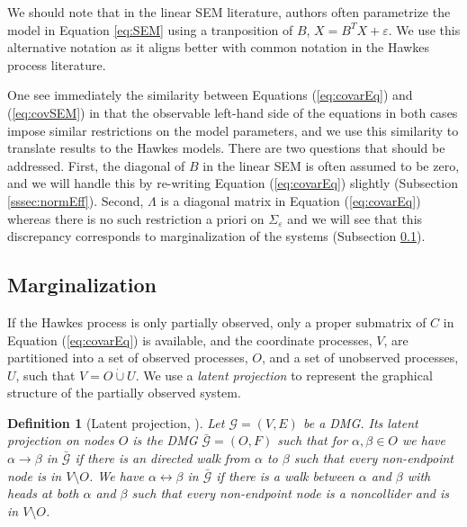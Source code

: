 \documentclass[accepted]{uai2021} %
\newtheorem{defn}[thm]{Definition}
\newcommand{\disjU}{\mathbin{\dot{\cup}}}
\begin{document}
We should note that in the linear SEM literature, authors often parametrize 
the model in Equation \ref{eq:SEM} using a 
tranposition of $B$, $X = B^TX + \varepsilon$. We use this alternative notation 
as it 
aligns better with common 
notation 
in the Hawkes process literature.

One see immediately the similarity between Equations (\ref{eq:covarEq}) 
and (\ref{eq:covSEM}) in that the observable left-hand side of the equations in 
both cases impose similar restrictions on the model parameters, and we use 
this similarity to translate results to the Hawkes models. There are two 
questions that should be addressed. First, the diagonal of $B$ in 
the linear SEM is often assumed to be zero, and we will handle this by 
re-writing 
Equation (\ref{eq:covarEq}) slightly (Subsection \ref{sssec:normEff}). Second, 
$\Lambda$ 
is a diagonal matrix in Equation (\ref{eq:covarEq}) whereas there is no such 
restriction 
a priori on $\Sigma_\varepsilon$ and we will see that this discrepancy 
corresponds to marginalization of the systems (Subsection \ref{sssec:marg}).




\subsection{Marginalization}
\label{sssec:marg} 

If the Hawkes process is only partially observed, only a proper submatrix of 
$C$ in Equation (\ref{eq:covarEq}) is available, and the coordinate processes, 
$V$, are partitioned into a set of observed processes, $O$, and a set of 
unobserved processes, $U$, such that $V = O\disjU U$. We use a \emph{latent 
projection} to represent the graphical structure of the partially observed 
system.

\begin{defn}[Latent projection, \cite{vermaEquiAndSynthesis,richardson2017}]
	\label{def:latProj}
	Let $\mathcal{G} = (V,E)$ be a DMG. Its latent projection on nodes $O$ is 
	the DMG $\bar{\mathcal{G}} = (O,F)$ such that for $\alpha,\beta\in O$ we 
	have $\alpha\rightarrow\beta$ in $\bar{\mathcal{G}}$ if there is an 
	directed walk from $\alpha$ to $\beta$ such that every non-endpoint node is 
	in $V\setminus O$. We have 
	$\alpha\leftrightarrow\beta$ in $\bar{\mathcal{G}}$ if there is a walk 
	between $\alpha$ and $\beta$ with heads at 
	both $\alpha$ and $\beta$ such that every non-endpoint node is a 
	noncollider and is in 
	$V\setminus O$.
\end{defn}
\end{document}
